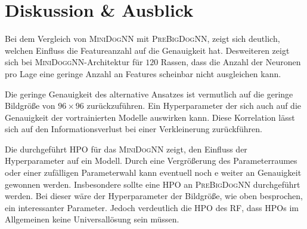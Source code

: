 \section{Diskussion \& Ausblick}
Bei dem Vergleich von \textsc{MiniDogNN} mit \textsc{PreBigDogNN},
zeigt sich deutlich, welchen Einfluss die Featureanzahl auf die Genauigkeit hat.
Desweiteren zeigt sich bei \textsc{MiniDoggNN}-Architektur
für $120$ Rassen, dass die Anzahl der Neuronen pro Lage eine geringe Anzahl an
Features scheinbar nicht ausgleichen kann.

Die geringe Genauigkeit des alternative Ansatzes ist vermutlich auf die
geringe Bildgröße von $96\times96$ zurückzuführen.
Ein Hyperparameter der sich auch auf die Genauigkeit der vortrainierten Modelle
auswirken kann. Diese Korrelation lässt sich auf den Informationsverlust bei
einer Verkleinerung zurückführen.

Die durchgeführt HPO für das \textsc{MiniDogNN} zeigt, den Einfluss der
Hyperparameter auf ein Modell. Durch eine Vergrößerung
des Parameterraumes oder einer zufälligen Parameterwahl kann eventuell noch e
weiter an Genauigkeit gewonnen werden. Insbesondere sollte eine HPO an
\textsc{PreBigDogNN} durchgeführt werden. Bei dieser wäre der Hyperparameter
der Bildgröße, wie oben besprochen, ein interessanter Parameter. Jedoch verdeutlich
die HPO des RF, dass HPOs im Allgemeinen keine Universallösung sein müssen.

